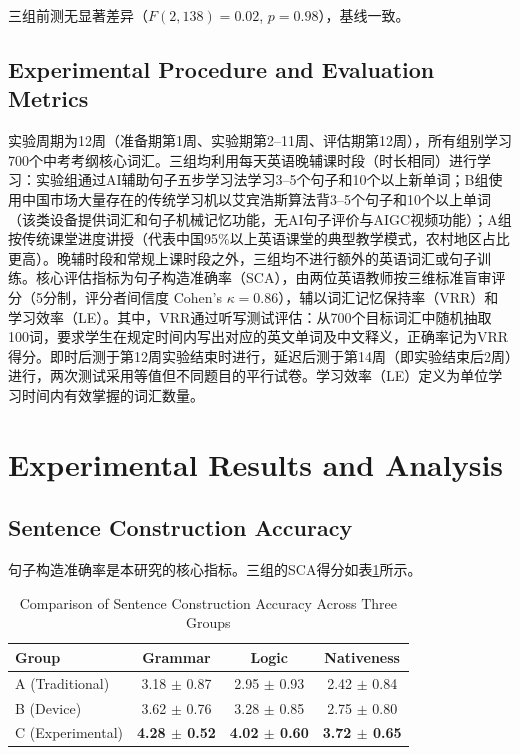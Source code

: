 \documentclass[Afour,sageapa,times]{sagej}
\begin{document}
三组前测无显著差异（$F(2,138)=0.02$, $p=0.98$），基线一致。

\subsection{Experimental Procedure and Evaluation Metrics}
实验周期为12周（准备期第1周、实验期第2--11周、评估期第12周），所有组别学习700个中考考纲核心词汇。三组均利用每天英语晚辅课时段（时长相同）进行学习：实验组通过AI辅助句子五步学习法学习3--5个句子和10个以上新单词；B组使用中国市场大量存在的传统学习机以艾宾浩斯算法背3--5个句子和10个以上单词（该类设备提供词汇和句子机械记忆功能，无AI句子评价与AIGC视频功能）；A组按传统课堂进度讲授（代表中国95\%以上英语课堂的典型教学模式，农村地区占比更高）。晚辅时段和常规上课时段之外，三组均不进行额外的英语词汇或句子训练。核心评估指标为句子构造准确率（SCA），由两位英语教师按三维标准盲审评分（5分制，评分者间信度 Cohen's $\kappa = 0.86$），辅以词汇记忆保持率（VRR）和学习效率（LE）。其中，VRR通过听写测试评估：从700个目标词汇中随机抽取100词，要求学生在规定时间内写出对应的英文单词及中文释义，正确率记为VRR得分。即时后测于第12周实验结束时进行，延迟后测于第14周（即实验结束后2周）进行，两次测试采用等值但不同题目的平行试卷。学习效率（LE）定义为单位学习时间内有效掌握的词汇数量。


\section{Experimental Results and Analysis}  %

\subsection{Sentence Construction Accuracy}
句子构造准确率是本研究的核心指标。三组的SCA得分如表\ref{tab:sca}所示。

\begin{table}[H]
\centering
\small
\caption{Comparison of Sentence Construction Accuracy Across Three Groups\label{tab:sca}}
\begin{tabular}{lccc}
\toprule
\textbf{Group} & \textbf{Grammar} & \textbf{Logic} & \textbf{Nativeness} \\
\midrule
A (Traditional) & 3.18 $\pm$ 0.87 & 2.95 $\pm$ 0.93 & 2.42 $\pm$ 0.84 \\
B (Device) & 3.62 $\pm$ 0.76 & 3.28 $\pm$ 0.85 & 2.75 $\pm$ 0.80 \\
C (Experimental) & \textbf{4.28 $\pm$ 0.52} & \textbf{4.02 $\pm$ 0.60} & \textbf{3.72 $\pm$ 0.65} \\
\bottomrule
\end{tabular}
\end{table}
\end{document}

